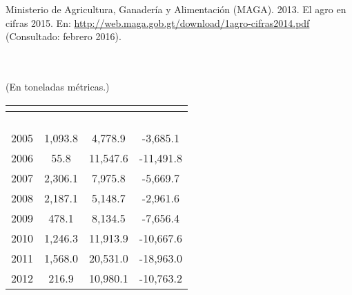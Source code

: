 	{\footnotesize	Ministerio de Agricultura, Ganadería y Alimentación (MAGA). 2013. El agro en cifras 2015. En: \url{http://web.maga.gob.gt/download/1agro-cifras2014.pdf}  (Consultado: febrero 2016).}

	
	
	{\Bold\color{color1!80!black}{Cuadro \theCuadro $\,-$    Comercio exterior de frijol (Phaseolus vulgaris), por año.}}\\
	{\Bold\color{color1!80!black}{República de Guatemala,  2005 - 2014.}}\\
	{(En toneladas métricas.)}\\[-2cm]
	
	\begin{center}
		\begin{tabular}{cS[table-format=8]S[table-format=8]S[table-format=8]}
			\\
			[0.4cm]
			\hline &&&\\[-0.36cm]  
			 &	\\[0.05cm]
			& &	 &	 \\[0.05cm]
			\hline
			&	&&\\[-0.35cm]
				2005	&	1,093.8	&	4,778.9	&	-3,685.1	\\[0.05cm]
			2006	&	55.8	&	11,547.6	&	-11,491.8	\\[0.05cm]
				2007	&	2,306.1	&	7,975.8	&	-5,669.7	\\[0.05cm]
			2008	&	2,187.1	&	5,148.7	&	-2,961.6	\\[0.05cm]
				2009	&	478.1	&	8,134.5	&	-7,656.4	\\[0.05cm]
			2010	&	1,246.3	&	11,913.9	&	-10,667.6	\\[0.05cm]
				2011	&	1,568.0	&	20,531.0	&	-18,963.0	\\[0.05cm]
			2012	&	216.9	&	10,980.1	&	-10,763.2	\\[0.05cm]

\end{tabular}
\end{center}
